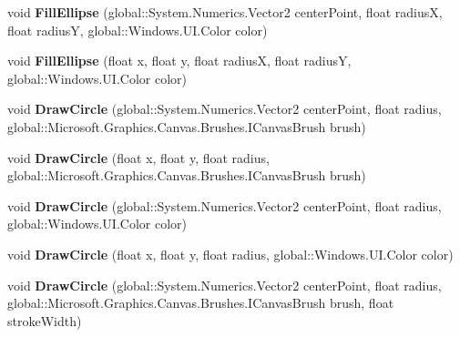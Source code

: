 \begin{DoxyCompactItemize}
void {\bfseries Fill\+Ellipse} (global\+::\+System.\+Numerics.\+Vector2 center\+Point, float radiusX, float radiusY, global\+::\+Windows.\+U\+I.\+Color color)
\item 
\mbox{\label{interface_microsoft_1_1_graphics_1_1_canvas_1_1_i_canvas_drawing_session_a5b40f04edde1afbb326d55b6d88062f9}} 
void {\bfseries Fill\+Ellipse} (float x, float y, float radiusX, float radiusY, global\+::\+Windows.\+U\+I.\+Color color)
\item 
\mbox{\label{interface_microsoft_1_1_graphics_1_1_canvas_1_1_i_canvas_drawing_session_ab2f4ba74043603bdaffdd3f323940ca7}} 
void {\bfseries Draw\+Circle} (global\+::\+System.\+Numerics.\+Vector2 center\+Point, float radius, global\+::\+Microsoft.\+Graphics.\+Canvas.\+Brushes.\+I\+Canvas\+Brush brush)
\item 
\mbox{\label{interface_microsoft_1_1_graphics_1_1_canvas_1_1_i_canvas_drawing_session_af7c160387eafb948f3c310d4ae7f78d2}} 
void {\bfseries Draw\+Circle} (float x, float y, float radius, global\+::\+Microsoft.\+Graphics.\+Canvas.\+Brushes.\+I\+Canvas\+Brush brush)
\item 
\mbox{\label{interface_microsoft_1_1_graphics_1_1_canvas_1_1_i_canvas_drawing_session_a41acf0e619b661268925f5cb2e6bf330}} 
void {\bfseries Draw\+Circle} (global\+::\+System.\+Numerics.\+Vector2 center\+Point, float radius, global\+::\+Windows.\+U\+I.\+Color color)
\item 
\mbox{\label{interface_microsoft_1_1_graphics_1_1_canvas_1_1_i_canvas_drawing_session_ad80cf99f40aa32997e96d33202fc5d88}} 
void {\bfseries Draw\+Circle} (float x, float y, float radius, global\+::\+Windows.\+U\+I.\+Color color)
\item 
\mbox{\label{interface_microsoft_1_1_graphics_1_1_canvas_1_1_i_canvas_drawing_session_a63a1527d82dc4d26bdba8b57c41b472a}} 
void {\bfseries Draw\+Circle} (global\+::\+System.\+Numerics.\+Vector2 center\+Point, float radius, global\+::\+Microsoft.\+Graphics.\+Canvas.\+Brushes.\+I\+Canvas\+Brush brush, float stroke\+Width)

\end{DoxyCompactItemize}
